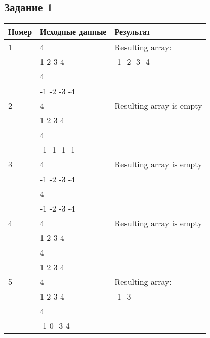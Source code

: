 \subsection*{\centering Задание 1}
\begin{table}[H]
    \centering
    \begin{tabular}{|l|l|l|}
        \hline
        Номер & Исходные данные & Результат\\[2ex] \hline
        1     & 4               & Resulting array:\\
              & 1 2 3 4         & -1 -2 -3 -4\\ 
              & 4               & \\ 
              & -1 -2 -3 -4     & \\[2ex]\hline
        2     & 4               & Resulting array is empty\\
              & 1 2 3 4         & \\ 
              & 4               & \\ 
              & -1 -1 -1 -1     & \\[2ex]\hline
        3     & 4               & Resulting array is empty\\
              & -1 -2 -3 -4     & \\ 
              & 4               & \\ 
              & -1 -2 -3 -4     & \\[2ex]\hline
        4     & 4               & Resulting array is empty\\
              & 1 2 3 4         & \\ 
              & 4               & \\ 
              & 1 2 3 4         & \\[2ex]\hline
        5     & 4               & Resulting array:\\
              & 1 2 3 4         & -1 -3\\ 
              & 4               & \\ 
              & -1 0 -3 4       & \\[2ex]\hline
    \end{tabular}
\end{table}
\pagebreak

